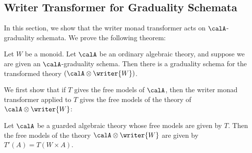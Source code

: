 \subsection{Writer Transformer for Graduality Schemata}

In this section, we show that the writer monad transformer acts on
$\calA$-graduality schemata. We prove the following theorem:
\begin{theorem}
  Let $W$ be a monoid. Let $\calA$ be an ordinary algebraic theory, and
  suppose we are given an $\calA$-graduality schema. Then there is a graduality
  schema for the transformed theory $(\calA \otimes \writer{W})$.
\end{theorem}

We first show that if $T$ gives the free models of $\calA$, then the writer monad
transformer applied to $T$ gives the free models of the theory of $\calA \otimes
\writer{W}$:
\begin{lemma}\label{lem:writer-monad-transformer-free-models}
    Let $\calA$ be a guarded algebraic theory whose free models are given by
    $T$. Then the free models of the theory $\calA \otimes \writer{W}$ are given by
    $T'(A) = T(W \times A)$.
\end{lemma}
